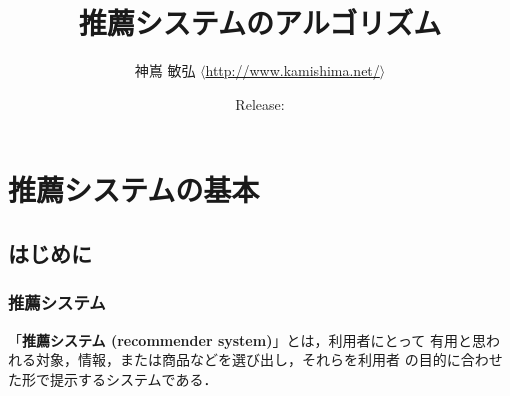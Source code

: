 \documentclass[11pt,a4paper,papersize,oneside]{jsbook}
\title{推薦システムのアルゴリズム}
\author{神嶌 敏弘 $\langle$\url{http://www.kamishima.net/}$\rangle$}
\date{Release: }
\begin{document}
\frontmatter

\maketitle

\onehalfspacing




\tableofcontents

\mainmatter

\part{推薦システムの基本}
\chapter{はじめに}
\section{推薦システム}

「\textbf{推薦システム (recommender system)}」とは，利用者にとって
有用と思われる対象，情報，または商品などを選び出し，それらを利用者
の目的に合わせた形で提示するシステムである．



\backmatter
\singlespacing
\pagestyle{empty}





\printindex
\end{document}
